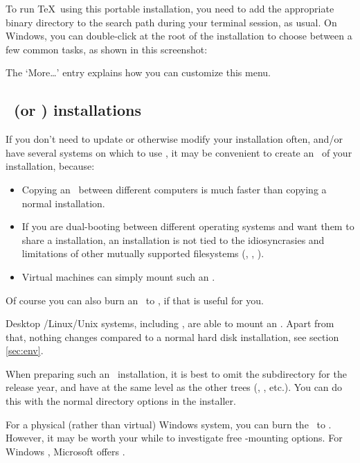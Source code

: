\documentclass{article}
\begin{document}
To run \TeX\ using this portable installation, you need to add the
appropriate binary directory to the search path during your terminal
session, as usual.  On Windows, you can double-click
 at the root of the installation to choose
between a few common tasks, as shown in this screenshot:

\medskip
{}
\smallskip

\noindent The `More\ldots' entry explains how you can customize this menu.


\subsection{\ISO\ (or \DVD) installations}
\label{sec:isoinstall}

If you don't need to update or otherwise modify your installation often,
and\slash or have several systems on which to use \TL{}, it may be
convenient to create an \ISO\ of your \TL{} installation, because:

\begin{itemize}
\item Copying an \ISO\ between different computers is much
  faster than copying a normal installation.
\item If you are dual-booting between different operating systems
  and want them to share a \TL{} installation, an \ISO
  installation is not tied to the idiosyncrasies and limitations of
  other mutually supported filesystems (, ,
  ).
\item Virtual machines can simply mount such an \ISO.
\end{itemize}

Of course you can also burn an \ISO\ to \DVD, if that is useful for you.

Desktop \GNU/Linux/Unix systems, including \MacOSX, are able to mount an
\ISO. Apart from that, nothing changes compared to a normal hard disk
installation, see section \ref{sec:env}.

When preparing such an \ISO\ installation, it is best to omit the
subdirectory for the release year, and have
 at the same level as the other trees
(, , etc.).  You can do this with
the normal directory options in the installer.

For a physical (rather than virtual) Windows system, you can burn the
\ISO\ to . However, it may be worth your while to investigate
free \ISO-mounting options. For Windows , Microsoft offers
.
\end{document}
